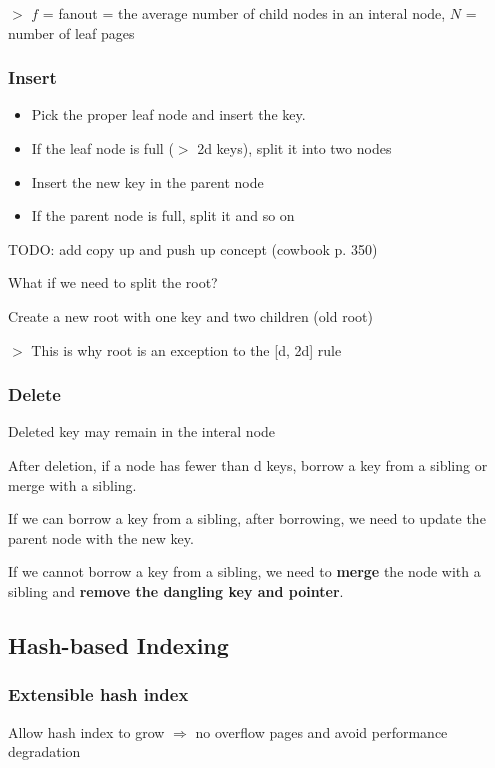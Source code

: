 \documentclass[12pt,a4paper]{article}
\newcommand{\remark}[1]{
    $>$ {\color{blue} #1}
}
\begin{document}
\remark{$f$ = fanout = the average number of child nodes in an interal node, $N$ = number of leaf pages}

\subsubsection{Insert}

\begin{itemize}
    \item Pick the proper leaf node and insert the key.
    \item If the leaf node is full ($>$ 2d keys), split it into two nodes
    \item Insert the new key in the parent node
    \item If the parent node is full, split it and so on
\end{itemize}

TODO: add copy up and push up concept (cowbook p. 350)


What if we need to split the root?

Create a new root with one key and two children (old root)

\remark{This is why root is an exception to the [d, 2d] rule}

\subsubsection{Delete}

Deleted key may remain in the interal node

After deletion, if a node has fewer than d keys, borrow a key from a sibling or merge with a sibling. 

If we can borrow a key from a sibling, after borrowing, we need to update the parent node with the new key.

If we cannot borrow a key from a sibling, we need to \textbf{merge} the node with a sibling and \textbf{remove the dangling key and pointer}.

\subsection*{Hash-based Indexing}

\subsubsection{Extensible hash index}

Allow hash index to grow $\Rightarrow$ no overflow pages and avoid performance degradation
\end{document}
